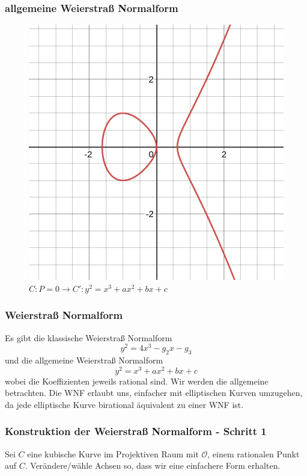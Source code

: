 \documentclass{beamer}
\begin{document}
\begin{frame}
\frametitle{allgemeine Weierstraß Normalform}
    \begin{figure}
		\caption{$C: P=0 \to C': y^2=x^3+ax^2+bx+c$}
		\includegraphics[scale=0.3]{images/desmos-graph02.png}
    \end{figure}
\end{frame}

\begin{frame}
\frametitle{Weierstraß Normalform}
	Es gibt die klassische Weierstraß Normalform
	\[y^2=4x^3-g_2x-g_3\]
	und die allgemeine Weierstraß Normalform
	\[y^2=x^3+ax^2+bx+c\]
	wobei die Koeffizienten jeweils rational sind. Wir werden die
	allgemeine betrachten. Die WNF erlaubt uns, einfacher mit
	elliptischen Kurven umzugehen, da jede elliptische Kurve
	birational äquivalent zu einer WNF ist.
\end{frame}

\begin{frame}
\frametitle{Konstruktion der Weierstraß Normalform - Schritt 1}
	Sei \(C\) eine kubische Kurve im Projektiven Raum
	mit \(\mathcal{O}\), einem rationalen Punkt auf \(C\).
	Verändere/wähle Achsen so, dass wir eine einfachere Form
	erhalten.
\end{frame}
\end{document}

